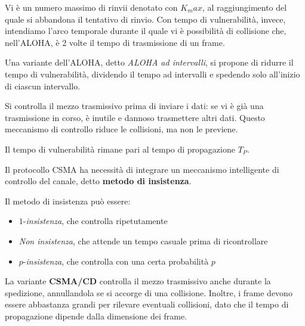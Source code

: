                 Vi è un numero massimo di rinvii denotato con $K_max$, al raggiungimento del quale si abbandona il tentativo di rinvio. Con tempo di vulnerabilità, invece, intendiamo l'arco temporale durante il quale vi è possibilità di collisione che, nell'ALOHA, è 2 volte il tempo di trasmissione di un frame.
                
                \vspace{3mm}
                
                Una variante dell'ALOHA, detto \textit{ALOHA ad intervalli}, si propone di ridurre il tempo di vulnerabilità, dividendo il tempo ad intervalli e spedendo solo all'inizio di ciascun intervallo.
                
            
                Si controlla il mezzo trasmissivo prima di inviare i dati: se vi è già una trasmissione in corso, è inutile e dannoso trasmettere altri dati. Questo meccanismo di controllo riduce le collisioni, ma non le previene.
                
                Il tempo di vulnerabilità rimane pari al tempo di propagazione $T_P$.
                
                \vspace{3mm}
                
                Il protocollo CSMA ha necessità di integrare un meccanismo intelligente di controllo del canale, detto \textbf{metodo di insistenza}.
                
                Il metodo di insistenza può essere:
                
                \begin{itemize}
                    \item $1$-\textit{insistenza}, che controlla ripetutamente
                    \item \textit{Non insistenza}, che attende un tempo casuale prima di ricontrollare
                    \item $p$-\textit{insistenza}, che controlla con una certa probabilità $p$
                \end{itemize}
                
                La variante \textbf{CSMA/CD} controlla il mezzo trasmissivo anche durante la spedizione, annullandola se si accorge di una collisione. Inoltre, i frame devono essere abbastanza grandi per rilevare eventuali collisioni, dato che il tempo di propagazione dipende dalla dimensione dei frame.
                
